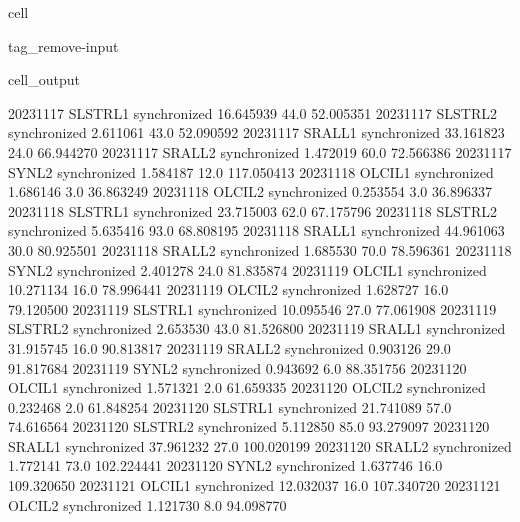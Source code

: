 \documentclass[letterpaper,10pt,english]{jupyterBook}
\begin{document}
\begin{sphinxuseclass}{cell}
\begin{sphinxuseclass}{tag_remove-input}
\begin{sphinxVerbatimOutput}
\begin{sphinxuseclass}{cell_output}
\begin{sphinxVerbatim}[commandchars=\\\{\}]
2023\PYGZhy{}11\PYGZhy{}17     SLSTR\PYGZus{}L1  synchronized   16.645939    44.0   52.005351
2023\PYGZhy{}11\PYGZhy{}17     SLSTR\PYGZus{}L2  synchronized    2.611061    43.0   52.090592
2023\PYGZhy{}11\PYGZhy{}17      SRAL\PYGZus{}L1  synchronized   33.161823    24.0   66.944270
2023\PYGZhy{}11\PYGZhy{}17      SRAL\PYGZus{}L2  synchronized    1.472019    60.0   72.566386
2023\PYGZhy{}11\PYGZhy{}17       SYN\PYGZus{}L2  synchronized    1.584187    12.0  117.050413
2023\PYGZhy{}11\PYGZhy{}18      OLCI\PYGZus{}L1  synchronized    1.686146     3.0   36.863249
2023\PYGZhy{}11\PYGZhy{}18      OLCI\PYGZus{}L2  synchronized    0.253554     3.0   36.896337
2023\PYGZhy{}11\PYGZhy{}18     SLSTR\PYGZus{}L1  synchronized   23.715003    62.0   67.175796
2023\PYGZhy{}11\PYGZhy{}18     SLSTR\PYGZus{}L2  synchronized    5.635416    93.0   68.808195
2023\PYGZhy{}11\PYGZhy{}18      SRAL\PYGZus{}L1  synchronized   44.961063    30.0   80.925501
2023\PYGZhy{}11\PYGZhy{}18      SRAL\PYGZus{}L2  synchronized    1.685530    70.0   78.596361
2023\PYGZhy{}11\PYGZhy{}18       SYN\PYGZus{}L2  synchronized    2.401278    24.0   81.835874
2023\PYGZhy{}11\PYGZhy{}19      OLCI\PYGZus{}L1  synchronized   10.271134    16.0   78.996441
2023\PYGZhy{}11\PYGZhy{}19      OLCI\PYGZus{}L2  synchronized    1.628727    16.0   79.120500
2023\PYGZhy{}11\PYGZhy{}19     SLSTR\PYGZus{}L1  synchronized   10.095546    27.0   77.061908
2023\PYGZhy{}11\PYGZhy{}19     SLSTR\PYGZus{}L2  synchronized    2.653530    43.0   81.526800
2023\PYGZhy{}11\PYGZhy{}19      SRAL\PYGZus{}L1  synchronized   31.915745    16.0   90.813817
2023\PYGZhy{}11\PYGZhy{}19      SRAL\PYGZus{}L2  synchronized    0.903126    29.0   91.817684
2023\PYGZhy{}11\PYGZhy{}19       SYN\PYGZus{}L2  synchronized    0.943692     6.0   88.351756
2023\PYGZhy{}11\PYGZhy{}20      OLCI\PYGZus{}L1  synchronized    1.571321     2.0   61.659335
2023\PYGZhy{}11\PYGZhy{}20      OLCI\PYGZus{}L2  synchronized    0.232468     2.0   61.848254
2023\PYGZhy{}11\PYGZhy{}20     SLSTR\PYGZus{}L1  synchronized   21.741089    57.0   74.616564
2023\PYGZhy{}11\PYGZhy{}20     SLSTR\PYGZus{}L2  synchronized    5.112850    85.0   93.279097
2023\PYGZhy{}11\PYGZhy{}20      SRAL\PYGZus{}L1  synchronized   37.961232    27.0  100.020199
2023\PYGZhy{}11\PYGZhy{}20      SRAL\PYGZus{}L2  synchronized    1.772141    73.0  102.224441
2023\PYGZhy{}11\PYGZhy{}20       SYN\PYGZus{}L2  synchronized    1.637746    16.0  109.320650
2023\PYGZhy{}11\PYGZhy{}21      OLCI\PYGZus{}L1  synchronized   12.032037    16.0  107.340720
2023\PYGZhy{}11\PYGZhy{}21      OLCI\PYGZus{}L2  synchronized    1.121730     8.0   94.098770

\end{sphinxVerbatim}
\end{sphinxuseclass}
\end{sphinxVerbatimOutput}
\end{sphinxuseclass}
\end{sphinxuseclass}
\end{document}
